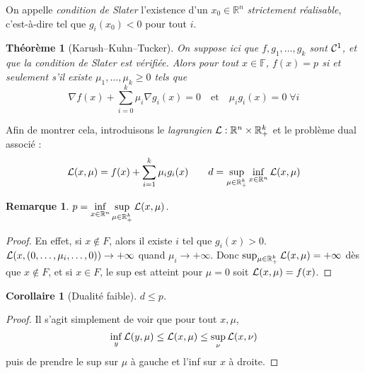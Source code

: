 \documentclass[a4paper, 11pt]{article}
\def\F{\mathbb{F}}
\def\R{\mathbb{R}}
\def\L{{\cal{L}}}
\def\Cf{{\cal{C}}}
\newtheorem*{theorem}{Théorème}
\newtheorem*{remark}{Remarque}
\newtheorem*{corollary}{Corollaire}
\begin{document}
On appelle \emph{condition de Slater} l'existence d'un $x_0 \in \R^n$
\emph{strictement réalisable}, c'est-à-dire tel que $g_i(x_0) < 0$ pour tout
$i$.

\begin{theorem}[Karush--Kuhn--Tucker]
  On suppose ici que $f, g_1, \ldots, g_k$ sont $\Cf^1$, et que la condition de
  Slater est vérifiée. Alors pour tout $x \in \F$, $f(x) = p$ si et seulement
  s'il existe $\mu_1, \ldots, \mu_k \geq 0$ tels que
  \[ \nabla f(x) + \sum_{i=0}^k \mu_i \nabla g_i(x) = 0 \quad \text{et} \quad
    \mu_i g_i(x) = 0\; \forall i
  \]
\end{theorem}

Afin de montrer cela, introduisons le \emph{lagrangien} $\L : \R^n \times
\R_+^k$ et le problème dual associé :
\[ \L(x, \mu) = f(x) + \sum_{i=1}^k \mu_i g_i(x) \qquad
  d = \sup_{\mu \in \R_+^k} \inf_{x \in \R^n} \L(x,\mu) \]

\begin{remark} $\displaystyle p = \inf_{x \in \R^n} \sup_{\mu \in \R_+^k}
  \L(x,\mu)$.
\end{remark}
\begin{proof}
  En effet, si $x \not\in F$, alors il existe $i$ tel que $g_i(x) > 0$.
  $\L(x,(0, \ldots, \mu_i, \ldots, 0)) \to +\infty$ quand $\mu_i \to
  +\infty$. Donc $\sup_{\mu \in \R_+^k} \L(x,\mu) = +\infty$ dès que $x \not\in
  F$, et si $x \in F$, le sup est atteint pour $\mu = 0$ soit $\L(x,\mu) =
  f(x)$.
\end{proof}
\begin{corollary}[Dualité faible]
  $d \leq p$.
\end{corollary}
\begin{proof}
  Il s'agit simplement de voir que pour tout $x, \mu$,
  \[ \inf_{y} \L(y, \mu) \leq \L(x,\mu) \leq \sup_{\nu} \L(x,\nu) \]
  puis de prendre le sup sur $\mu$ à gauche et l'inf sur $x$ à droite.
\end{proof}
\end{document}
